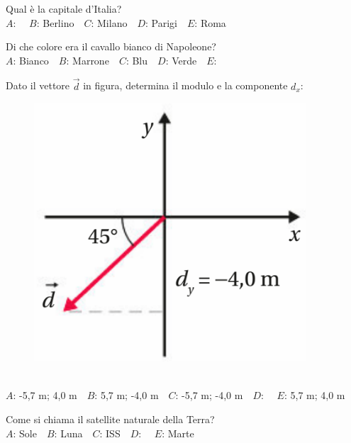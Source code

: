 \mcquestionfooter



\def\mcquestionnumber{6}


\mcquestionheader Qual è la capitale d’Italia?\\
{$A$}: \ \ {$B$}: Berlino\ \ {$C$}: Milano\ \ {$D$}: Parigi\ \ {$E$}: Roma\ \ 

\mcquestionfooter



\def\mcquestionnumber{7}


\mcquestionheader Di che colore era il cavallo bianco di Napoleone?\\
{$A$}: Bianco\ \ {$B$}: Marrone\ \ {$C$}: Blu\ \ {$D$}: Verde\ \ {$E$}: \ \ 

\mcquestionfooter



\def\mcquestionnumber{8}


\mcquestionheader Dato il vettore $\vec{d}$ in figura, determina il modulo e la componente $d_x$: \begin{figure}[h!]   \begin{center}     \includegraphics[scale=0.35]{vettored.png}   \end{center} \end{figure}\\
{$A$}: -5,7 m; 4,0 m\ \ {$B$}: 5,7 m; -4,0 m\ \ {$C$}: -5,7 m; -4,0 m\ \ {$D$}: \ \ {$E$}: 5,7 m; 4,0 m\ \ 

\mcquestionfooter



\def\mcquestionnumber{9}


\mcquestionheader Come si chiama il satellite naturale della Terra?\\
{$A$}: Sole\ \ {$B$}: Luna\ \ {$C$}: ISS\ \ {$D$}: \ \ {$E$}: Marte\ \ 

